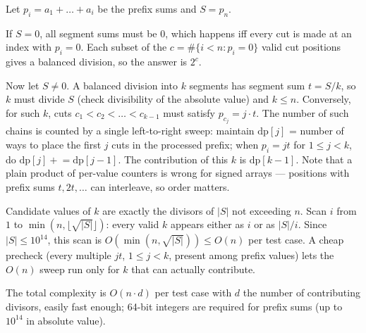 Let $p_i = a_1 + \dots + a_i$ be the prefix sums and $S = p_n$.

If $S = 0$, all segment sums must be $0$, which happens iff every cut is made at an index with $p_i = 0$. Each subset of the $c = \#\{i < n : p_i = 0\}$ valid cut positions gives a balanced division, so the answer is $2^c$.

Now let $S \neq 0$. A balanced division into $k$ segments has segment sum $t = S / k$, so $k$ must divide $S$ (check divisibility of the absolute value) and $k \le n$. Conversely, for such $k$, cuts $c_1 < c_2 < \dots < c_{k-1}$ must satisfy $p_{c_j} = j \cdot t$. The number of such chains is counted by a single left-to-right sweep: maintain $\text{dp}[j]$ = number of ways to place the first $j$ cuts in the processed prefix; when $p_i = j t$ for $1 \le j < k$, do $\text{dp}[j] \mathrel{+}= \text{dp}[j-1]$. The contribution of this $k$ is $\text{dp}[k-1]$. Note that a plain product of per-value counters is wrong for signed arrays --- positions with prefix sums $t, 2t, \ldots$ can interleave, so order matters.

Candidate values of $k$ are exactly the divisors of $|S|$ not exceeding $n$. Scan $i$ from $1$ to $\min(n, \lfloor\sqrt{|S|}\rfloor)$: every valid $k$ appears either as $i$ or as $|S|/i$. Since $|S| \le 10^{14}$, this scan is $O(\min(n, \sqrt{|S|})) \le O(n)$ per test case. A cheap precheck (every multiple $j t$, $1 \le j < k$, present among prefix values) lets the $O(n)$ sweep run only for $k$ that can actually contribute.

The total complexity is $O(n \cdot d)$ per test case with $d$ the number of contributing divisors, easily fast enough; 64-bit integers are required for prefix sums (up to $10^{14}$ in absolute value).
